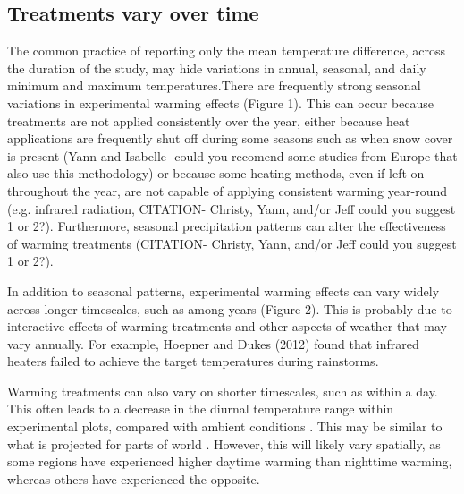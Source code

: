 \documentclass{article}
\begin{document}
\subsection* {Treatments vary over time}
The common practice of reporting only the mean temperature difference, across the duration of the study, may hide variations in annual, seasonal, and daily minimum and maximum temperatures.There are frequently strong seasonal variations in experimental warming effects (Figure 1). This can occur because treatments are not applied consistently over the year, either because heat applications are frequently shut off during some seasons such as when snow cover is present \citep[e.g.][]{clark2014a,clark2014b} (Yann and Isabelle- could you recomend some studies from Europe that also use this methodology) or because some heating methods, even if left on throughout the year, are not capable of applying consistent warming year-round (e.g. infrared radiation, CITATION- Christy, Yann, and/or Jeff could you suggest 1 or 2?). Furthermore, seasonal precipitation patterns can alter the effectiveness of warming treatments (CITATION- Christy, Yann, and/or Jeff could you suggest 1 or 2?). %

\par In addition to seasonal patterns, experimental warming effects can vary widely across longer timescales, such as among years (Figure 2). This is probably due to interactive effects of warming treatments and other aspects of weather that may vary annually. For example, Hoepner and Dukes (2012) found that infrared heaters failed to achieve the target temperatures during rainstorms. 

\par Warming treatments can also vary on shorter timescales, such as within a day. This often leads to a decrease in the diurnal temperature range within experimental plots, compared with ambient conditions \citep{hoeppner2012}. This may be similar to what is projected for parts of world \citep{ipcc2013}. However, this will likely vary spatially, as some regions have experienced higher daytime warming than nighttime warming, whereas others have experienced the opposite\citep{ipcc2013}. 
\end{document}
